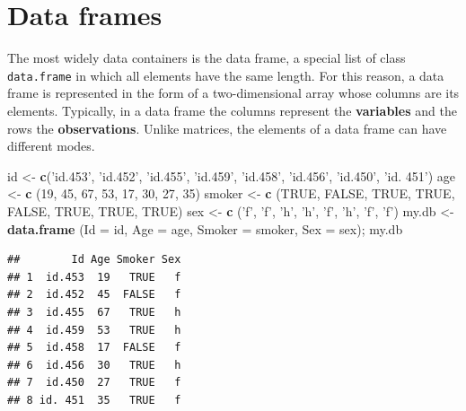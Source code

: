 \documentclass[]{book}
\newenvironment{Shaded}{\begin{snugshade}}{\end{snugshade}}
\newcommand{\DataTypeTok}[1]{\textcolor[rgb]{0.13,0.29,0.53}{#1}}
\newcommand{\DecValTok}[1]{\textcolor[rgb]{0.00,0.00,0.81}{#1}}
\newcommand{\KeywordTok}[1]{\textcolor[rgb]{0.13,0.29,0.53}{\textbf{#1}}}
\newcommand{\NormalTok}[1]{#1}
\newcommand{\OtherTok}[1]{\textcolor[rgb]{0.56,0.35,0.01}{#1}}
\newcommand{\StringTok}[1]{\textcolor[rgb]{0.31,0.60,0.02}{#1}}
\begin{document}
\hypertarget{data-frames}{%
\section{Data frames}\label{data-frames}}

The most widely data containers is the data frame, a special list of class \texttt{data.frame} in which all elements have the same length. For this reason, a data frame is represented in the form of a two-dimensional array whose columns are its elements. Typically, in a data frame the columns represent the \textbf{variables} and the rows the \textbf{observations}. Unlike matrices, the elements of a data frame can have different modes.

\begin{Shaded}
\begin{Highlighting}[]
\NormalTok{id <-}\StringTok{ }\KeywordTok{c}\NormalTok{(}\StringTok{'id.453'}\NormalTok{, }\StringTok{'id.452'}\NormalTok{, }\StringTok{'id.455'}\NormalTok{, }\StringTok{'id.459'}\NormalTok{, }\StringTok{'id.458'}\NormalTok{, }\StringTok{'id.456'}\NormalTok{, }\StringTok{'id.450'}\NormalTok{, }\StringTok{'id. 451'}\NormalTok{)}
\NormalTok{age <-}\StringTok{ }\KeywordTok{c}\NormalTok{ (}\DecValTok{19}\NormalTok{, }\DecValTok{45}\NormalTok{, }\DecValTok{67}\NormalTok{, }\DecValTok{53}\NormalTok{, }\DecValTok{17}\NormalTok{, }\DecValTok{30}\NormalTok{, }\DecValTok{27}\NormalTok{, }\DecValTok{35}\NormalTok{)}
\NormalTok{smoker <-}\StringTok{ }\KeywordTok{c}\NormalTok{ (}\OtherTok{TRUE}\NormalTok{, }\OtherTok{FALSE}\NormalTok{, }\OtherTok{TRUE}\NormalTok{, }\OtherTok{TRUE}\NormalTok{, }\OtherTok{FALSE}\NormalTok{, }\OtherTok{TRUE}\NormalTok{, }\OtherTok{TRUE}\NormalTok{, }\OtherTok{TRUE}\NormalTok{)}
\NormalTok{sex <-}\StringTok{ }\KeywordTok{c}\NormalTok{ (}\StringTok{'f'}\NormalTok{, }\StringTok{'f'}\NormalTok{, }\StringTok{'h'}\NormalTok{, }\StringTok{'h'}\NormalTok{, }\StringTok{'f'}\NormalTok{, }\StringTok{'h'}\NormalTok{, }\StringTok{'f'}\NormalTok{, }\StringTok{'f'}\NormalTok{)}
\NormalTok{my.db <-}\StringTok{ }\KeywordTok{data.frame}\NormalTok{ (}\DataTypeTok{Id =}\NormalTok{ id, }\DataTypeTok{Age =}\NormalTok{ age, }\DataTypeTok{Smoker =}\NormalTok{ smoker, }\DataTypeTok{Sex =}\NormalTok{ sex); my.db}
\end{Highlighting}
\end{Shaded}

\begin{verbatim}
##        Id Age Smoker Sex
## 1  id.453  19   TRUE   f
## 2  id.452  45  FALSE   f
## 3  id.455  67   TRUE   h
## 4  id.459  53   TRUE   h
## 5  id.458  17  FALSE   f
## 6  id.456  30   TRUE   h
## 7  id.450  27   TRUE   f
## 8 id. 451  35   TRUE   f
\end{verbatim}
\end{document}
